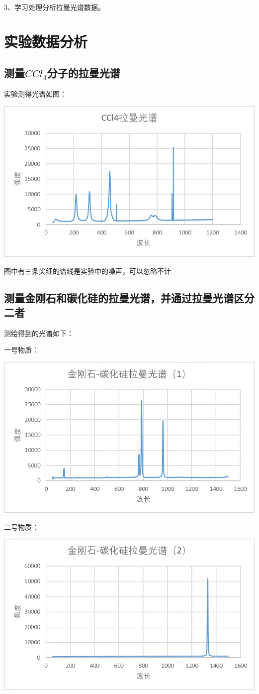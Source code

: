 \documentclass[hyperref]{ctexart}
\begin{document}
\begin{multicols}{2}
		3、学习处理分析拉曼光谱数据。
		
		
		
		\section{实验数据分析}
		\subsection{测量$CCl_4$分子的拉曼光谱}
		实验测得光谱如图：
		
		\includegraphics[width = 0.75\linewidth]{Riemann_CCl4.png}
		
		图中有三条尖细的谱线是实验中的噪声，可以忽略不计
		
		\subsection{测量金刚石和碳化硅的拉曼光谱，并通过拉曼光谱区分二者}
		测绘得到的光谱如下：
		
		一号物质：
		
		\includegraphics[width = 0.75\linewidth]{Riemann_C_SiC_1.png}
		
		二号物质：
		
		\includegraphics[width = 0.75\linewidth]{Riemann_C_SiC_2.png}
		

\end{multicols}
\end{document}
